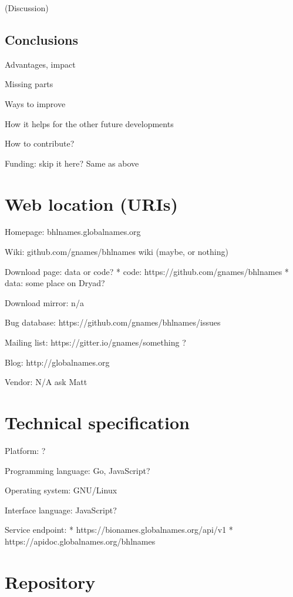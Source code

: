 \documentclass[
]{article}
\begin{document}
(Discussion)

\hypertarget{conclusions}{%
\subsection{Conclusions}\label{conclusions}}

Advantages, impact

Missing parts

Ways to improve

How it helps for the other future developments

How to contribute?

Funding: skip it here? Same as above

\hypertarget{web-location-uris}{%
\section{Web location (URIs)}\label{web-location-uris}}

Homepage: bhlnames.globalnames.org

Wiki: github.com/gnames/bhlnames wiki (maybe, or nothing)

Download page: data or code? * code: https://github.com/gnames/bhlnames
* data: some place on Dryad?

Download mirror: n/a

Bug database: https://github.com/gnames/bhlnames/issues

Mailing list: https://gitter.io/gnames/something ?

Blog: http://globalnames.org

Vendor: N/A ask Matt

\hypertarget{technical-specification}{%
\section{Technical specification}\label{technical-specification}}

Platform: ?

Programming language: Go, JavaScript?

Operating system: GNU/Linux

Interface language: JavaScript?

Service endpoint: * https://bionames.globalnames.org/api/v1 *
https://apidoc.globalnames.org/bhlnames

\hypertarget{repository}{%
\section{Repository}\label{repository}}
\end{document}
